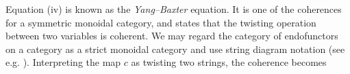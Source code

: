 \begin{observation}
\label{obs:yb-eq}
    Equation (iv) is known as the \emph{Yang--Baxter} equation. 
    It is one of the coherences for a symmetric monoidal category, and states that the twisting operation between two variables is coherent.
    We may regard the category of endofunctors on a category as a strict monoidal category and use string diagram notation (see e.g. \cite{selinger2010survey}).
    Interpreting the map $c$ as twisting two strings, the coherence becomes 
    \begin{center}
        
    \end{center}
\end{observation}

